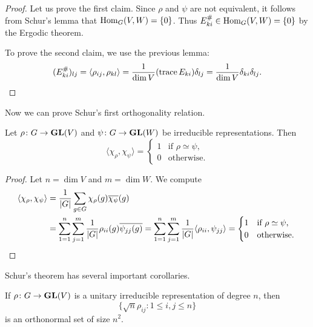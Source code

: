 \begin{proof}
    Let us prove the first claim. Since 
    $\rho$ and $\psi$ 
    are not equivalent, it follows from Schur's lemma that $\operatorname{Hom}_G(V,W)=\{0\}$.
    Thus $E_{ki}^\#\in\operatorname{Hom}_G(V,W)=\{0\}$ by the Ergodic theorem. 
    
    To prove the second claim, we use the previous lemma:
    \[
    (E_{ki}^\#)_{lj}=\langle\rho_{ij},\rho_{kl}\rangle
    =\frac{1}{\dim V}(\operatorname{trace} E_{ki})\delta_{lj}
    =\frac{1}{\dim V}\delta_{ki}\delta_{lj}.\qedhere
    \]
\end{proof}

Now we can prove Schur's first orthogonality relation.

\begin{theorem}[Schur]
Let $\rho\colon G\to\mathbf{GL}(V)$ and $\psi\colon G\to\mathbf{GL}(W)$ be irreducible representations. Then
\[
\langle\chi_\rho,\chi_\psi\rangle=
\begin{cases}
1 & \text{if $\rho\simeq\psi$,}\\
0 & \text{otherwise.}
\end{cases}
\]
\end{theorem}

\begin{proof}
    Let $n=\dim V$ and $m=\dim W$. We compute
    \begin{align*}
        \langle\chi_\rho,\chi_\psi\rangle
        &=\frac{1}{|G|}\sum_{g\in G}\chi_\rho(g)\overline{\chi_\psi}(g)\\
        &=\sum_{1=1}^n\sum_{j=1}^m\frac{1}{|G|}\rho_{ii}(g)\overline{\psi_{jj}(g)}
        =\sum_{1=1}^n\sum_{j=1}^m\frac{1}{|G|}\langle \rho_{ii},\psi_{jj}\rangle
        =\begin{cases}
            1 & \text{if $\rho\simeq\psi$,}\\
            0 & \text{otherwise.}
        \end{cases}\qedhere
    \end{align*}
\end{proof}

Schur's theorem has several important corollaries.

If $\rho\colon G\to\mathbf{GL}(V)$ is a unitary irreducible representation 
of degree $n$, then
\[
\{\sqrt{n}\rho_{ij}:1\leq i,j\leq n\}
\]
is an orthonormal set of size $n^2$.

